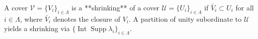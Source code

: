 A cover $\mathcal{V} = \{V_i\}_{i \in \Lambda}$ is a **shrinking** of a cover $\mathcal{U} = \{U_i\}_{i \in \Lambda}$ if $\bar{V}_i \subset U_i$ for all $i \in \Lambda$, where $\bar{V}_i$ denotes the closure of $V_i$. A partition of unity subordinate to $\mathcal{U}$ yields a shrinking via $\{\operatorname{Int} \operatorname{Supp} \lambda_i\}_{i \in \Lambda}$.

